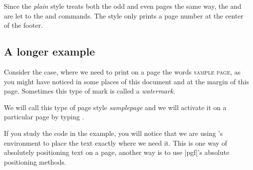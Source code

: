 Since the \textit{plain} style treats both the odd and even pages the same way, the  and  are let to the  and  commands. The style only prints a page number at the center of the footer.


\subsection{A longer example}

\thispagestyle{samplepage}
Consider the case, where we need to print on a page the words \textsc{sample page}, as you might have noticed in some places of this document and at the margin of this page. Sometimes this type of mark is called a \textit{watermark.}

We will call this type of page style \textit{samplepage} and we will activate it on a particular page by typing .




%
%
%
%
%

If you study the code in the example, you will notice that we are using \LaTeXe's  environment to
place the text exactly where we need it. This is one way of absolutely positioning text on a page, another way is to use |pgf|’s absolute positioning methods.




